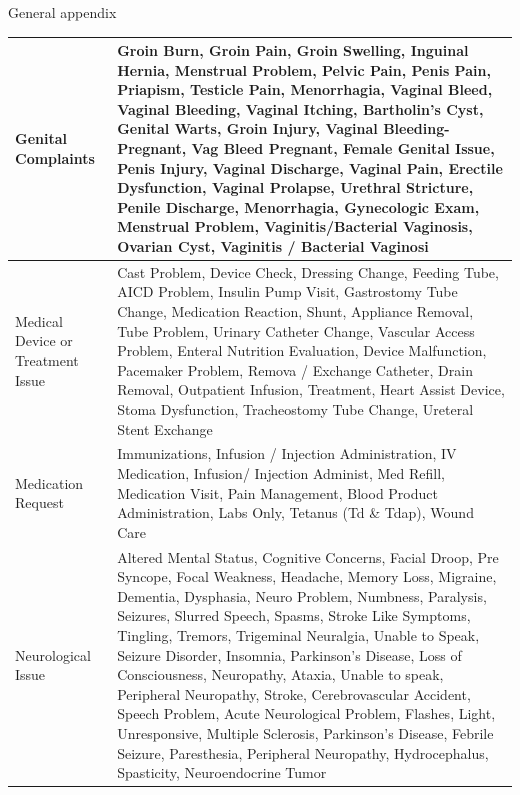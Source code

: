 \documentclass[,,nonblindrev]{informs}
\begin{document}
\begin{APPENDIX}{General appendix}
\begin{longtable}{|p{5cm}|p{12cm}|}
\hline
Genital Complaints & Groin Burn, Groin Pain, Groin Swelling, Inguinal Hernia, Menstrual Problem, Pelvic Pain, Penis Pain, Priapism, Testicle Pain, Menorrhagia, Vaginal Bleed, Vaginal Bleeding, Vaginal Itching, Bartholin's Cyst, Genital Warts, Groin Injury, Vaginal Bleeding-Pregnant, Vag Bleed Pregnant, Female Genital Issue, Penis Injury, Vaginal Discharge, Vaginal Pain, Erectile Dysfunction, Vaginal Prolapse, Urethral Stricture, Penile Discharge, Menorrhagia, Gynecologic Exam, Menstrual Problem, Vaginitis/Bacterial Vaginosis, Ovarian Cyst, Vaginitis / Bacterial Vaginosi \\
\hline
Medical Device or Treatment Issue & Cast Problem, Device Check, Dressing Change, Feeding Tube, AICD Problem, Insulin Pump Visit, Gastrostomy Tube Change, Medication Reaction, Shunt, Appliance Removal, Tube Problem, Urinary Catheter Change, Vascular Access Problem, Enteral Nutrition Evaluation, Device Malfunction, Pacemaker Problem, Remova /  Exchange Catheter, Drain Removal, Outpatient Infusion, Treatment, Heart Assist Device, Stoma Dysfunction, Tracheostomy Tube Change, Ureteral Stent Exchange \\
\hline
Medication Request & Immunizations, Infusion / Injection Administration, IV Medication, Infusion/ Injection Administ, Med Refill, Medication Visit, Pain Management, Blood Product Administration, Labs Only, Tetanus (Td \& Tdap), Wound Care \\
\hline
Neurological Issue & Altered Mental Status, Cognitive Concerns, Facial Droop, Pre Syncope, Focal Weakness, Headache, Memory Loss, Migraine, Dementia, Dysphasia, Neuro Problem, Numbness, Paralysis, Seizures, Slurred Speech, Spasms, Stroke Like Symptoms, Tingling, Tremors, Trigeminal Neuralgia, Unable to Speak, Seizure Disorder, Insomnia, Parkinson's Disease, Loss of Consciousness, Neuropathy, Ataxia, Unable to speak, Peripheral Neuropathy, Stroke, Cerebrovascular Accident, Speech Problem, Acute Neurological Problem, Flashes, Light, Unresponsive, Multiple Sclerosis, Parkinson's Disease, Febrile Seizure, Paresthesia, Peripheral Neuropathy, Hydrocephalus, Spasticity, Neuroendocrine Tumor \\
\hline

\end{longtable}
\end{APPENDIX}
\end{document}

